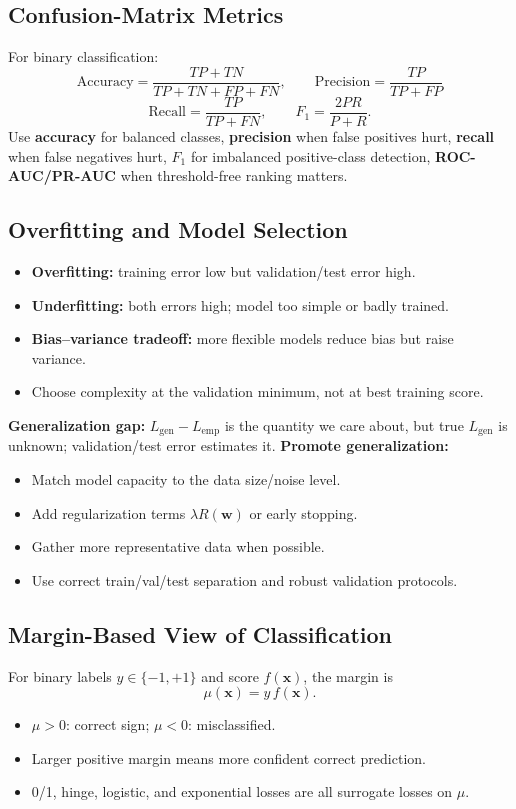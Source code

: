 \documentclass[10pt,twocolumn]{article}
\newcommand{\x}{\mathbf{x}}
\newcommand{\w}{\mathbf{w}}
\newcommand{\chead}[1]{\vspace{0.15em}\textbf{#1:} }
\begin{document}
\subsection{Confusion-Matrix Metrics}
For binary classification:
\[
\text{Accuracy}=\frac{TP+TN}{TP+TN+FP+FN},\qquad
\text{Precision}=\frac{TP}{TP+FP}
\]
\[
\text{Recall}=\frac{TP}{TP+FN},\qquad
F_1=\frac{2PR}{P+R}.
\]
Use \textbf{accuracy} for balanced classes, \textbf{precision} when false positives hurt, \textbf{recall} when false negatives hurt, \textbf{$F_1$} for imbalanced positive-class detection, \textbf{ROC-AUC/PR-AUC} when threshold-free ranking matters.

\subsection{Overfitting and Model Selection}
\begin{itemize}
  \item \textbf{Overfitting:} training error low but validation/test error high.
  \item \textbf{Underfitting:} both errors high; model too simple or badly trained.
  \item \textbf{Bias--variance tradeoff:} more flexible models reduce bias but raise variance.
  \item Choose complexity at the validation minimum, not at best training score.
\end{itemize}
\chead{Generalization gap} $L_{\mathrm{gen}}-L_{\mathrm{emp}}$ is the quantity we care about, but true $L_{\mathrm{gen}}$ is unknown; validation/test error estimates it.
\chead{Promote generalization}
\begin{itemize}
  \item Match model capacity to the data size/noise level.
  \item Add regularization terms $\lambda R(\w)$ or early stopping.
  \item Gather more representative data when possible.
  \item Use correct train/val/test separation and robust validation protocols.
\end{itemize}

\subsection{Margin-Based View of Classification}
For binary labels $y\in\{-1,+1\}$ and score $f(\x)$, the margin is
\[
\mu(\x)=y\,f(\x).
\]
\begin{itemize}
  \item $\mu>0$: correct sign; $\mu<0$: misclassified.
  \item Larger positive margin means more confident correct prediction.
  \item 0/1, hinge, logistic, and exponential losses are all surrogate losses on $\mu$.
\end{itemize}
\end{document}
